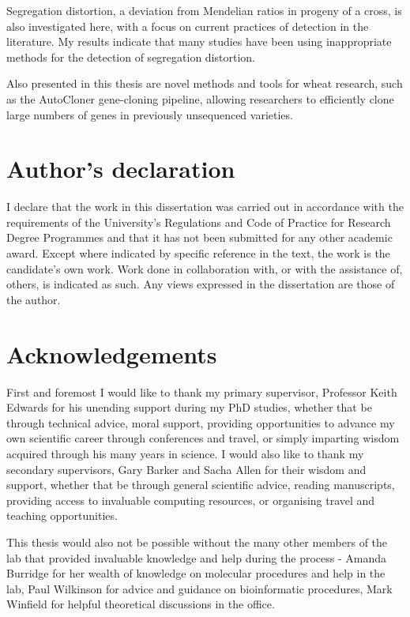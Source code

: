 Segregation distortion, a deviation from Mendelian ratios in progeny of a cross, is also investigated here, with a focus
on current practices of detection in the literature. My results indicate that many studies have been using inappropriate
methods for the detection of segregation distortion.

Also presented in this thesis are novel methods and tools for wheat research, such as the AutoCloner gene-cloning
pipeline, allowing researchers to efficiently clone large numbers of genes in previously unsequenced varieties.


\newpage

\section{Author's declaration}
I declare that the work in this dissertation was carried out in accordance with the requirements of the University's Regulations and Code of Practice for Research Degree Programmes and that it has not been submitted for any other academic award. Except where indicated by specific reference in the text, the work is the candidate's own work. Work done in collaboration with, or with the assistance of, others, is indicated as such. Any views expressed in the dissertation are those of the author.

\newpage


\section{Acknowledgements}

First and foremost I would like to thank my primary supervisor, Professor Keith Edwards for his unending support during
my PhD studies, whether that be through technical advice, moral support, providing opportunities to advance my own
scientific career through conferences and travel, or simply imparting wisdom acquired through his many years in science.
I would also like to thank my secondary supervisors, Gary Barker and Sacha Allen for their wisdom and support, whether
that be through general scientific advice, reading manuscripts, providing access to invaluable computing resources, or
organising travel and teaching opportunities.

This thesis would also not be possible without the many other members of the lab that provided invaluable knowledge and
help during the process - Amanda Burridge for her wealth of knowledge on molecular procedures and help in the lab, Paul
Wilkinson for advice and guidance on bioinformatic procedures, Mark Winfield for helpful theoretical discussions in the
office.

